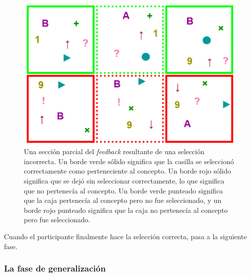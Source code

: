 \begin{figure}[h!] 
\begin{center}
    	\includegraphics[scale=0.5]{papers/images_behavior_research_methods/FeedBack2SeleccionParcial.PNG}
	\caption{
	Una sección parcial del {\em feedback} resultante de una selección incorrecta. Un borde verde sólido significa que la casilla se seleccionó correctamente como perteneciente al concepto. Un borde rojo sólido significa que se dejó sin seleccionar correctamente, lo que significa que no pertenecía al concepto. Un borde verde punteado significa que la caja pertenecía al concepto pero no fue seleccionado, y un borde rojo punteado significa que la caja no pertenecía al concepto pero fue seleccionado.}
	\label{Figure:Misclassifications}
\end{center}
\end{figure}

Cuando el participante finalmente hace la selección correcta, pasa a la siguiente fase.

\subsubsection{La fase de generalización}\label{Subsection:generalization}

